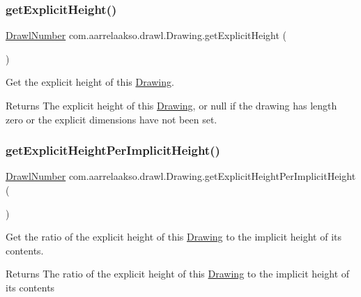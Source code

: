 \subsubsection{\texorpdfstring{get\+Explicit\+Height()}{getExplicitHeight()}}
{\footnotesize\ttfamily \hyperlink{classcom_1_1aarrelaakso_1_1drawl_1_1_drawl_number}{Drawl\+Number} com.\+aarrelaakso.\+drawl.\+Drawing.\+get\+Explicit\+Height (\begin{DoxyParamCaption}{ }\end{DoxyParamCaption})}



Get the explicit height of this \hyperlink{classcom_1_1aarrelaakso_1_1drawl_1_1_drawing}{Drawing}. 

\begin{DoxyReturn}{Returns}
The explicit height of this \hyperlink{classcom_1_1aarrelaakso_1_1drawl_1_1_drawing}{Drawing}, or null if the drawing has length zero or the explicit dimensions have not been set. 
\end{DoxyReturn}
\mbox{\label{classcom_1_1aarrelaakso_1_1drawl_1_1_drawing_ab4be923426dabfdaffecb5b3ff22b95b}} 
\subsubsection{\texorpdfstring{get\+Explicit\+Height\+Per\+Implicit\+Height()}{getExplicitHeightPerImplicitHeight()}}
{\footnotesize\ttfamily \hyperlink{classcom_1_1aarrelaakso_1_1drawl_1_1_drawl_number}{Drawl\+Number} com.\+aarrelaakso.\+drawl.\+Drawing.\+get\+Explicit\+Height\+Per\+Implicit\+Height (\begin{DoxyParamCaption}{ }\end{DoxyParamCaption})\hspace{0.3cm}{\ttfamily [private]}}



Get the ratio of the explicit height of this \hyperlink{classcom_1_1aarrelaakso_1_1drawl_1_1_drawing}{Drawing} to the implicit height of its contents. 

\begin{DoxyReturn}{Returns}
The ratio of the explicit height of this \hyperlink{classcom_1_1aarrelaakso_1_1drawl_1_1_drawing}{Drawing} to the implicit height of its contents 
\end{DoxyReturn}
\mbox{\label{classcom_1_1aarrelaakso_1_1drawl_1_1_drawing_a586f764563210b252eef4c35b2679cd3}} 
